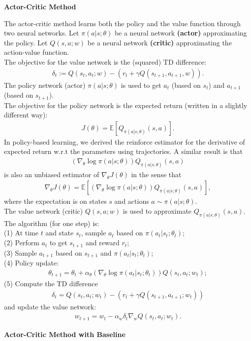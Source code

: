 \documentclass[12pt,oneside]{article}
\newcommand{\BE}[0]{\mathbb{E}}
\newcommand{\ali}[1]{\begin{align*}#1\end{align*}}
\newcommand{\ga}[0]{\gamma}
\theoremstyle{plain}
\theoremstyle{remark}
\begin{document}
{\bf Actor-Critic Method\\} 

The actor-critic method learns both the policy and the value function through two neural networks. Let $\pi(a|s;\theta)$ be a neural network {\bf (actor)} approximating the policy. Let $Q(s,a;w)$ be a neural network {\bf (critic)} approximating the action-value function.\\
The objective for the value network is the (squared) TD difference:
\ali{\delta_t := Q(s_t,a_t;w) - (r_t + \ga Q(s_{t+1},a_{t+1},w)).}
The policy network (actor) $\pi(a|s;\theta)$ is used to get $a_t$ (based on $s_t$) and $a_{t+1}$ (based on $s_{t+1}$).\\
The objective for the policy network is the expected return (written in a slightly different way):
\ali{ J(\theta) = \BE \left[ Q_{\pi(a|s;\theta)}(s, a) \right].}
In policy-based learning, we derived the reinforce estimator for the derivative of expected return w.r.t the parameters using trajectories. A similar result is that
\ali{(\nabla_\theta \log \pi(a|s;\theta)) Q_{\pi(a|s;\theta)}(s, a)}
is also an unbiased estimator of $\nabla_\theta J(\theta)$ in the sense that
\ali{ \nabla_\theta J(\theta) = \BE \left[(\nabla_\theta \log \pi(a|s;\theta)) Q_{\pi(a|s;\theta)}(s, a)\right],}
where the expectation is on states $s$ and actions $a \sim \pi(a|s;\theta)$. \\
The value network (critic) $Q(s,a;w)$ is used to approximate $Q_{\pi(a|s;\theta)}(s, a)$.\\

The algorithm (for one step) is:\\
(1) At time $t$ and state $s_t$, sample $a_t$ based on $\pi(a_t|s_t;\theta_t)$;\\
(2) Perform $a_t$ to get $s_{t+1}$ and reward $r_t$;\\
(3) Sample $a_{t+1}$ based on $s_{t+1}$ and $\pi(a_t|s_t;\theta_t)$;\\
(4) Policy update: 
\ali{\theta_{t+1} = \theta_t + \alpha_\theta  (\nabla_\theta \log \pi(a_t|s_t;\theta_t)) Q(s_t, a_t; w_t);}
(5) Compute the TD difference
\ali{\delta_t = Q(s_t,a_t;w_t) - (r_t + \ga Q(s_{t+1},a_{t+1};w_t))}
and update the value network:
\ali{w_{t+1} = w_t - \alpha_w \delta_t \nabla_w Q(s_t,a_t;w_t).}

{\bf Actor-Critic Method with Baseline\\}
\end{document}
